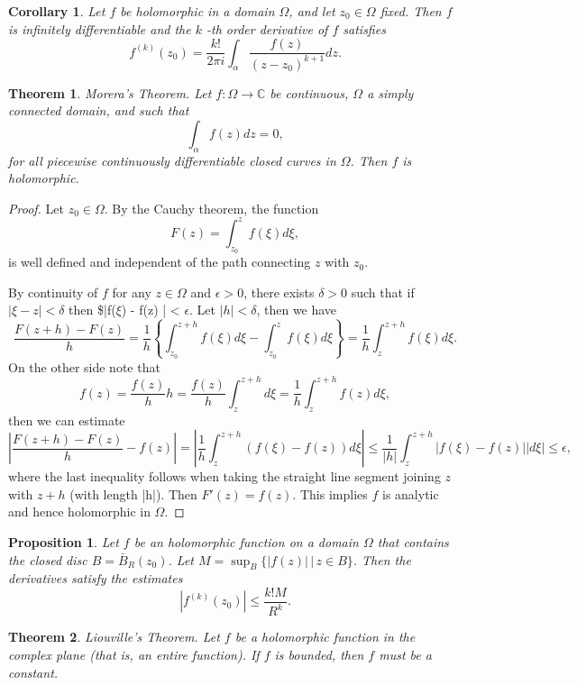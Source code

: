 \documentclass{amsart}
\newtheorem{thm}{Theorem}
\newtheorem{prop}{Proposition}
\newtheorem{cor}{Corollary}
\begin{document}
\begin{cor}
Let \(f\) be holomorphic in a domain \(\Omega\), and let \(z_0\in \Omega\) fixed. Then \(f\) is infinitely differentiable and the \(k\) -th order derivative of \(f\) satisfies
\[ f^{(k)}(z_0) = \frac{k!}{2\pi i} \int_{\alpha}\frac{f(z)}{(z-z_0)^{k+1}}dz. \]
\end{cor}


\begin{thm}
\alert{Morera's Theorem}. Let \(f:\Omega \to \mathbb{C}\) be continuous, \(\Omega\) a simply connected domain, and such that
\[ \int_{\alpha} f(z) dz = 0, \]
for all piecewise continuously differentiable closed curves in \(\Omega\). Then \(f\) is holomorphic.
\end{thm}
\begin{proof}
Let \(z_0\in \Omega\). By the Cauchy theorem, the function 
\[ F(z) = \int_{z_0}^{z} f(\xi) d\xi,\]
is well defined and independent of the path connecting \(z\) with \(z_0\).

By continuity of \(f\) for any \(z \in \Omega\) and \(\epsilon >0\), there exists \(\delta >0\) such that if \(|\xi - z| < \delta\) then \$|f(\(\xi\)) - f(z) | < \(\epsilon\). Let \(|h| < \delta\), then we have
\[ \frac{F(z + h) - F(z)}{h} = \frac{1}{h} \left\{ \int_{z_0}^{z + h} f(\xi)d\xi  - \int_{z_0}^{z} f(\xi)d\xi \right\} = \frac{1}{h}\int_{z}^{z + h} f(\xi)d\xi. \]
On the other side note that 
\[ f(z) = \frac{f(z)}{h} h = \frac{f(z)}{h} \int_{z}^{z+h} d\xi = \frac{1}{h} \int_{z}^{z+h} f(z) d\xi, \]
then we can estimate
\[ \left| \frac{F(z + h) - F(z)}{h} - f(z) \right| = \left| \frac{1}{h} \int_{z}^{z+h} (f(\xi) - f(z)) d\xi \right| \leq \frac{1}{|h|} \int_{z}^{z+h} \left|f(\xi) - f(z)\right| \left| d\xi \right| \leq \epsilon,\]
where the last inequality follows when taking the straight line segment joining \(z\) with \(z + h\) (with length |h|).
Then \(F'(z) = f(z)\). This implies \(f\) is analytic and hence holomorphic in \(\Omega\).
\end{proof}

\begin{prop}
Let \(f\) be an holomorphic function on a domain \(\Omega\) that contains the closed disc \(B = \bar{B}_R(z_0)\). Let \(M = \sup_{B} \{ |f(z)| \, | \, z \in B\}\). Then the derivatives satisfy the estimates
\[ \left| f^{(k)}(z_0)\right| \leq \frac{k! M}{R^k} .\]
\end{prop}


\begin{thm}
\alert{Liouville's Theorem}. Let \(f\) be a holomorphic function in the complex plane (that is, an entire function). If \(f\) is bounded, then \(f\) must be a constant.
\end{thm}
\end{document}
